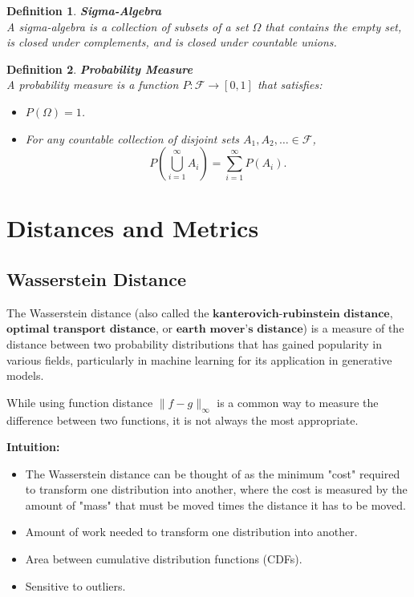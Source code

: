 \documentclass[11pt]{book}
\newtheorem{definition}{Definition}[section]
\begin{document}
\begin{definition}{\textbf{Sigma-Algebra}} \\
    A sigma-algebra is a collection of subsets of a set \( \Omega \) that contains the empty set, is closed under complements, and is closed under countable unions.
\end{definition}

\begin{definition}{\textbf{Probability Measure}} \\
    A probability measure is a function \( P: \mathcal{F} \rightarrow [0,1] \) that satisfies:
    \begin{itemize}
        \item \( P(\Omega) = 1 \).
        \item For any countable collection of disjoint sets \( A_1, A_2, \ldots \in \mathcal{F} \), 
        \[
        P\left( \bigcup_{i=1}^{\infty} A_i \right) = \sum_{i=1}^{\infty} P(A_i).
        \]
    \end{itemize}
\end{definition}


\chapter{Distances and Metrics}

\section{Wasserstein Distance}

The Wasserstein distance (also called the $\textbf{kanterovich-rubinstein distance}$, \\
$\textbf{optimal transport distance}$, or $\textbf{earth mover's distance}$) 
is a measure of the distance between two probability distributions that has gained popularity in various fields, 
particularly in machine learning for its application in generative models.

\medbreak

While using function distance $\| f - g \|_\infty$ is a common way to measure the difference between two functions,
it is not always the most appropriate. 

\medbreak

\textbf{Intuition:} 
\begin{itemize}
    \item The Wasserstein distance can be thought of as the minimum "cost" required to transform one distribution into another, 
    where the cost is measured by the amount of "mass" that must be moved times the distance it has to be moved.
    \item Amount of work needed to transform one distribution into another.
    \item Area between cumulative distribution functions (CDFs).
    \item Sensitive to outliers.
\end{itemize}
\end{document}
